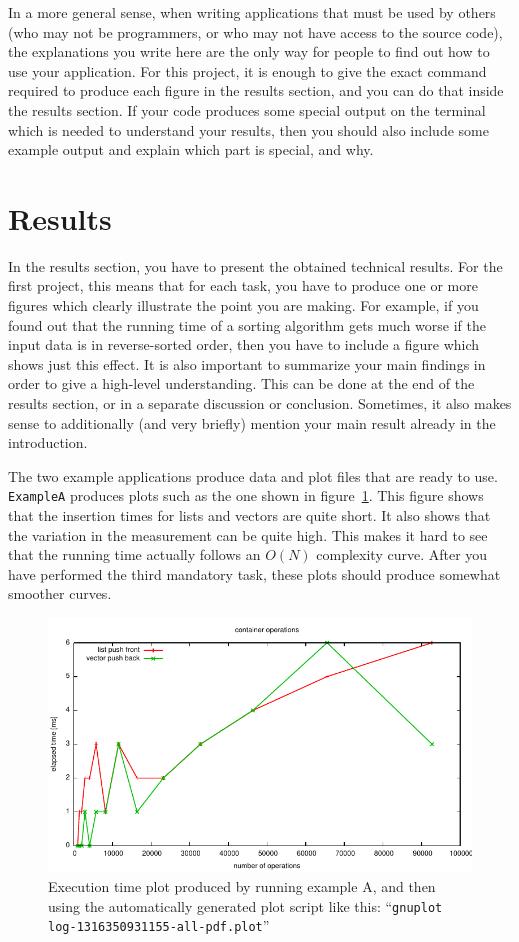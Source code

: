 \documentclass[a4paper,10pt]{article}
\begin{document}
In a more general sense, when writing applications that must be used by others (who may not be programmers, or who may not have access to the source code), the explanations you write here are the only way for people to find out how to use your application.
For this project, it is enough to give the exact command required to produce each figure in the results section, and you can do that inside the results section.
If your code produces some special output on the terminal which is needed to understand your results, then you should also include some example output and explain which part is special, and why.



\section{Results}

In the results section, you have to present the obtained technical results.
For the first project, this means that for each task, you have to produce one or more figures which clearly illustrate the point you are making.
For example, if you found out that the running time of a sorting algorithm gets much worse if the input data is in reverse-sorted order, then you have to include a figure which shows just this effect.
It is also important to summarize your main findings in order to give a high-level understanding.
This can be done at the end of the results section, or in a separate discussion or conclusion.
Sometimes, it also makes sense to additionally (and very briefly) mention your main result already in the introduction.

The two example applications produce data and plot files that are ready to use.
\texttt{ExampleA} produces plots such as the one shown in figure~\ref{fig:exa-plot}.
This figure shows that the insertion times for lists and vectors are quite short.
It also shows that the variation in the measurement can be quite high.
This makes it hard to see that the running time actually follows an $O(N)$ complexity curve.
After you have performed the third mandatory task, these plots should produce somewhat smoother curves.

\begin{figure}
  \centering
  \includegraphics[width=0.8\columnwidth]{plot-ExampleA.pdf}
  \caption{
    Execution time plot produced by running example A, and then using the automatically generated plot script like this:
    ``\texttt{gnuplot log-1316350931155-all-pdf.plot}''
  }\label{fig:exa-plot}
\end{figure}
\end{document}
